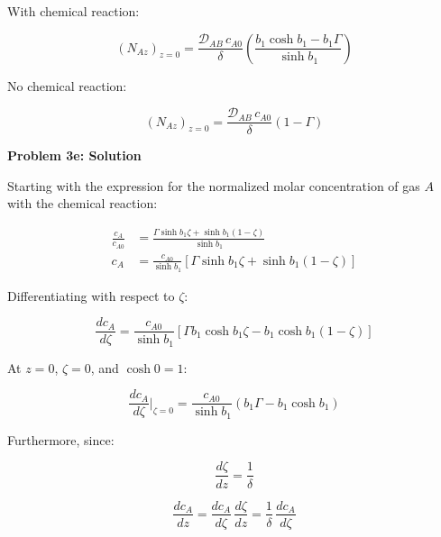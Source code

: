 \documentclass[letterpaper,12pt]{article}
\begin{document}
\medskip
With chemical reaction:

\begin{equation*}
    \left( N_{Az} \right)_{z=0}
    = \frac{\mathcal{D}_{AB} \, c_{A0}}{\delta}
    \left( \frac{ b_1 \cosh b_1 - b_1 \Gamma }{\sinh b_1} \right)
\end{equation*}

No chemical reaction:

\begin{equation*}
    \left( N_{Az} \right)_{z=0}
    = \frac{\mathcal{D}_{AB} \, c_{A0}}{\delta} \left( 1 - \Gamma \right)
\end{equation*}

\vspace{6pt}

\textbf{Problem 3e: Solution}

\vspace{6pt}

Starting with the expression for the normalized molar concentration of gas $A$ with the chemical reaction:

\begin{equation}
\begin{aligned}
    \frac{c_A}{c_{A0}} &= \frac{\Gamma\sinh b_1\zeta + \sinh b_1(1 - \zeta)}{\sinh b_1} \\
    c_A                &= \frac{c_{A0}}{\sinh b_1}\left[\Gamma\sinh b_1\zeta + \sinh b_1(1 - \zeta)\right]
\end{aligned}
\end{equation}

Differentiating with respect to $\zeta$:

\begin{equation}
    \frac{dc_A}{d\zeta} = \frac{c_{A0}}{\sinh b_1}\left[\Gamma b_1\cosh b_1\zeta - b_1\cosh b_1(1 - \zeta)\right]
\end{equation}

At $z = 0$, $\zeta = 0$, and $\cosh{0} = 1$:

\begin{equation}
    \frac{dc_A}{d\zeta}\bigg|_{\zeta=0} = \frac{c_{A0}}{\sinh b_1}\left(b_1\Gamma - b_1\cosh b_1\right)
\end{equation}

Furthermore, since:

\begin{equation}
    \frac{d\zeta}{dz} = \frac{1}{\delta}
\end{equation}

\begin{equation}
    \frac{dc_A}{dz} = \frac{dc_A}{d\zeta}\,\frac{d\zeta}{dz} = \frac{1}{\delta}\,\frac{dc_A}{d\zeta}
\end{equation}
\end{document}

